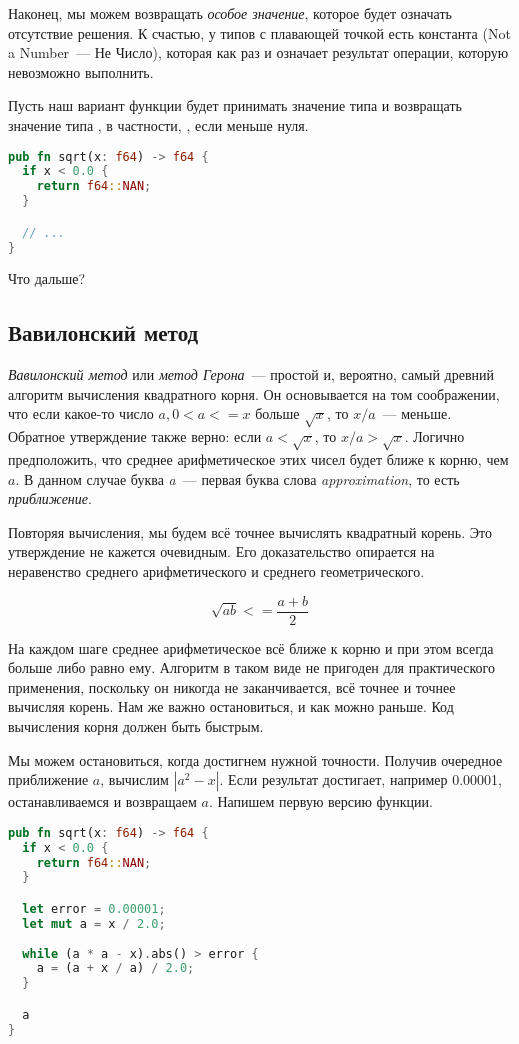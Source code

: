 Наконец, мы можем возвращать {\em особое значение}, которое будет означать отсутствие решения.
К счастью, у типов с плавающей точкой есть константа  (Not a Number — Не Число), которая как раз и означает результат операции, которую невозможно выполнить.

Пусть наш вариант функции  будет принимать значение типа  и возвращать значение типа , в частности, , если  меньше нуля.

\begin{lstlisting}[language=Rust]
pub fn sqrt(x: f64) -> f64 {
  if x < 0.0 {
    return f64::NAN;
  }

  // ...
}
\end{lstlisting}

Что дальше?

\subsection{Вавилонский метод}

{\em Вавилонский метод} или {\em метод Герона}~--- простой и, вероятно, самый древний алгоритм вычисления квадратного корня.
Он основывается на том соображении, что если какое-то число $a, 0 < a <= x$ больше $\sqrt x$, то $x/a$~--- меньше.
Обратное утверждение также верно: если $a < \sqrt x$, то $x/a > \sqrt x$.
Логично предположить, что среднее арифметическое этих чисел будет ближе к корню, чем $a$.
В данном случае буква {\em a}~--- первая буква слова {\em approximation}, то есть {\em приближение}.

Повторяя вычисления, мы будем всё точнее вычислять квадратный корень.
Это утверждение не кажется очевидным.
Его доказательство опирается на неравенство среднего арифметического и среднего геометрического.

$$
\sqrt {a b} <= \frac{a + b}{2}
$$

На каждом шаге среднее арифметическое всё ближе к корню и при этом всегда больше либо равно ему.
Алгоритм в таком виде не пригоден для практического применения, поскольку он никогда не заканчивается, всё точнее и точнее вычисляя корень.
Нам же важно остановиться, и как можно раньше.
Код вычисления корня должен быть быстрым.

Мы можем остановиться, когда достигнем нужной точности.
Получив очередное приближение $a$, вычислим $|a^2 - x|$.
Если результат достигает, например 0.00001, останавливаемся и возвращаем $a$.
Напишем первую версию функции.

\begin{lstlisting}[language=Rust]
pub fn sqrt(x: f64) -> f64 {
  if x < 0.0 {
    return f64::NAN;
  }

  let error = 0.00001;
  let mut a = x / 2.0;
  
  while (a * a - x).abs() > error {
    a = (a + x / a) / 2.0;
  }

  a
}
\end{lstlisting}

